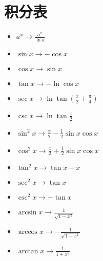 \section{积分表}
\begin{itemize}
	\item $ a^x \to \frac{a^x}{\ln a} $
	\item $ \sin x \to - \cos x $
	\item $ \cos x \to \sin x $
	\item $ \tan x \to - \ln \cos x $
	\item $ \sec x \to \ln \tan (\frac{x}{2} + \frac{\pi}{4}) $
	\item $ \csc x \to \ln \tan \frac{x}{2}$
	\item $ \sin^2 x \to \frac{x}{2} - \frac{1}{2} \sin x \cos x $
	\item $ \cos^2 x \to \frac{x}{2} + \frac{1}{2} \sin x \cos x $
	\item $ \tan^2 x \to \tan x - x $
	\item $ \sec^2 x \to \tan x $
	\item $ \csc^2 x \to - \tan x $
	\item $ \arcsin x \to \frac{1}{\sqrt{1 - x^2}} $
	\item $ \arccos x \to - \frac{1}{\sqrt{1 - x^2}} $
	\item $ \arctan x \to \frac{1}{1 + x^2} $
\end{itemize}